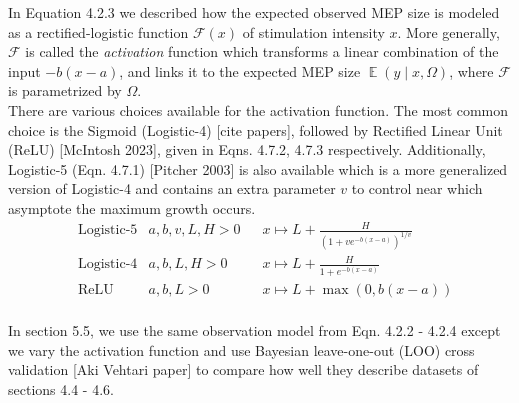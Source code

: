 \documentclass[a4paper,12pt]{article}
\DeclareMathOperator{\E}{\mathbb{E}}
\begin{document}
    In Equation 4.2.3 we described how the expected observed MEP size is modeled as a rectified-logistic function $\mathcal{F}\left(x\right)$ of stimulation intensity $x$. More generally, $\mathcal{F}$ is called the \textit{activation} function which transforms a linear combination of the input $-b(x - a)$, and links it to the expected MEP size $\E(y \mid x, \Omega)$, where $\mathcal{F}$ is parametrized by $\Omega$.\\

    There are various choices available for the activation function. The most common choice is the Sigmoid (Logistic-4) [cite papers], followed by Rectified Linear Unit (ReLU) [McIntosh 2023], given in Eqns. 4.7.2, 4.7.3 respectively. Additionally, Logistic-5 (Eqn. 4.7.1) [Pitcher 2003] is also available which is a more generalized version of Logistic-4 and contains an extra parameter $v$ to control near which asymptote the maximum growth occurs.\\
    \begin{align*}
        &\text{Logistic-5} & a, b, v, L, H > 0\ \;\;&x \mapsto L + \frac{H}{\left(1 + ve^{-b\left(x-a\right)}\right)^{1/v}}  \tag{4.7.1}\\
        &\text{Logistic-4} & a, b, L, H > 0\ \;\;&x \mapsto L + \frac{H}{1 + e^{-b\left(x-a\right)}}  \tag{4.7.2}\\
        &\text{ReLU} & a, b, L > 0\ \;\;&x \mapsto L + \max\left(0, b\left(x - a\right)\right)  \tag{4.7.3}\\
    \end{align*}

    In section 5.5, we use the same observation model from Eqn. 4.2.2 - 4.2.4 except we vary the activation function and use Bayesian leave-one-out (LOO) cross validation [Aki Vehtari paper] to compare how well they describe datasets of sections 4.4 - 4.6.
\end{document}
